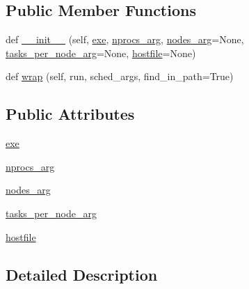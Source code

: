 \subsection*{Public Member Functions}
\begin{DoxyCompactItemize}
\item 
def \hyperlink{classcodar_1_1savanna_1_1runners_1_1_m_p_i_runner_a67662602e1fe9901e20e17a9f16b8259}{\+\_\+\+\_\+init\+\_\+\+\_\+} (self, \hyperlink{classcodar_1_1savanna_1_1runners_1_1_m_p_i_runner_a7ccd767eb30cbd555f387e5b4d781ffa}{exe}, \hyperlink{classcodar_1_1savanna_1_1runners_1_1_m_p_i_runner_aafcba954932f2160d43e820cf3abe6e1}{nprocs\+\_\+arg}, \hyperlink{classcodar_1_1savanna_1_1runners_1_1_m_p_i_runner_ad139718b16183bd45520e166d6d2b9b9}{nodes\+\_\+arg}=None, \hyperlink{classcodar_1_1savanna_1_1runners_1_1_m_p_i_runner_a58bd05be3e876f5a8f2522262ba934f7}{tasks\+\_\+per\+\_\+node\+\_\+arg}=None, \hyperlink{classcodar_1_1savanna_1_1runners_1_1_m_p_i_runner_ad36885eab0821c149e8798ffbf567af4}{hostfile}=None)
\item 
def \hyperlink{classcodar_1_1savanna_1_1runners_1_1_m_p_i_runner_a2eb86e6b8495ecf2361dc58e4b05c7c5}{wrap} (self, run, sched\+\_\+args, find\+\_\+in\+\_\+path=True)
\end{DoxyCompactItemize}
\subsection*{Public Attributes}
\begin{DoxyCompactItemize}
\item 
\hyperlink{classcodar_1_1savanna_1_1runners_1_1_m_p_i_runner_a7ccd767eb30cbd555f387e5b4d781ffa}{exe}
\item 
\hyperlink{classcodar_1_1savanna_1_1runners_1_1_m_p_i_runner_aafcba954932f2160d43e820cf3abe6e1}{nprocs\+\_\+arg}
\item 
\hyperlink{classcodar_1_1savanna_1_1runners_1_1_m_p_i_runner_ad139718b16183bd45520e166d6d2b9b9}{nodes\+\_\+arg}
\item 
\hyperlink{classcodar_1_1savanna_1_1runners_1_1_m_p_i_runner_a58bd05be3e876f5a8f2522262ba934f7}{tasks\+\_\+per\+\_\+node\+\_\+arg}
\item 
\hyperlink{classcodar_1_1savanna_1_1runners_1_1_m_p_i_runner_ad36885eab0821c149e8798ffbf567af4}{hostfile}
\end{DoxyCompactItemize}


\subsection{Detailed Description}


